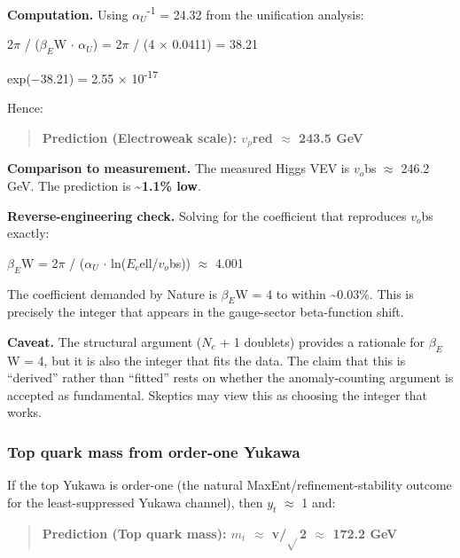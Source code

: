 \documentclass[11pt,a4paper]{article}
\theoremstyle{remark}
\begin{document}
\textbf{Computation.} Using \(\ensuremath{\alpha}_U\)\textsuperscript{-1} = 24.32 from the unification analysis:

2\ensuremath{\pi} / (\(\ensuremath{\beta}_E\)W \ensuremath{\cdot} \(\ensuremath{\alpha}_U\)) = 2\ensuremath{\pi} / (4 \ensuremath{\times} 0.0411) = 38.21

exp(\ensuremath{-}38.21) = 2.55 \ensuremath{\times} 10\textsuperscript{-17}

Hence:

\begin{quote}
\textbf{Prediction (Electroweak scale): \(v_p\)red \ensuremath{\approx} 243.5 GeV}
\end{quote}

\textbf{Comparison to measurement.} The measured Higgs VEV is \(v_o\)bs \ensuremath{\approx} 246.2 GeV.
The prediction is \textbf{\textasciitilde1.1\% low}.

\textbf{Reverse-engineering check.} Solving for the coefficient that reproduces \(v_o\)bs exactly:

\(\ensuremath{\beta}_E\)W = 2\ensuremath{\pi} / (\(\ensuremath{\alpha}_U\) \ensuremath{\cdot} ln(\(E_c\)ell/\(v_o\)bs)) \ensuremath{\approx} 4.001

The coefficient demanded by Nature is \(\ensuremath{\beta}_E\)W = 4 to within \textasciitilde0.03\%. This is precisely the integer that appears in the gauge-sector beta-function shift.

\textbf{Caveat.} The structural argument (\(N_c\) + 1 doublets) provides a rationale for \(\ensuremath{\beta}_E\)W = 4, but it is also the integer that fits the data. The claim that this is ``derived'' rather than ``fitted'' rests on whether the anomaly-counting argument is accepted as fundamental. Skeptics may view this as choosing the integer that works.

\subsubsection{Top quark mass from order-one Yukawa}\label{top-quark-mass-from-order-one-yukawa}

If the top Yukawa is order-one (the natural MaxEnt/refinement-stability outcome for the least-suppressed Yukawa channel), then \(y_t\) \ensuremath{\approx} 1 and:

\begin{quote}
\textbf{Prediction (Top quark mass): \(m_t\) \ensuremath{\approx} v/\ensuremath{\sqrt{}}2 \ensuremath{\approx} 172.2 GeV}
\end{quote}
\end{document}
